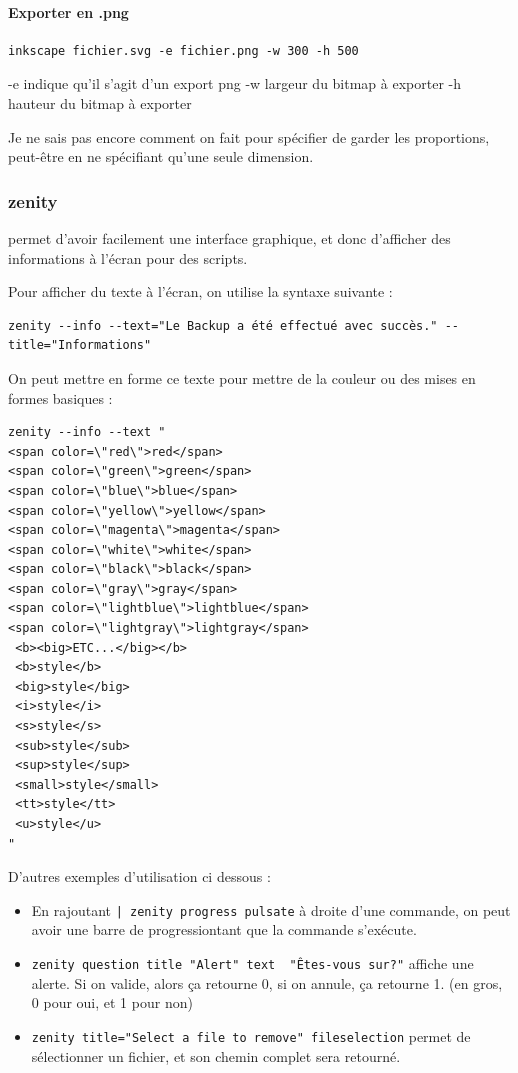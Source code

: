 \documentclass[a4paper,twoside]{article}
\begin{document}
\paragraph{Exporter en .png}
\begin{verbatim}
inkscape fichier.svg -e fichier.png -w 300 -h 500
\end{verbatim}

-e indique qu'il s'agit d'un export png
-w largeur du bitmap à exporter
-h hauteur du bitmap à exporter

\begin{remarque}
Je ne sais pas encore comment on fait pour spécifier de garder les proportions, peut-être en ne spécifiant qu'une seule dimension.
\end{remarque}

\subsubsection{zenity}\label{sec:zenity}
 permet d'avoir facilement une interface graphique, et donc d'afficher des informations à l'écran pour des scripts.

Pour afficher du texte à l'écran, on utilise la syntaxe suivante :

\begin{verbatim}
zenity --info --text="Le Backup a été effectué avec succès." --title="Informations"
\end{verbatim}

On peut mettre en forme ce texte pour mettre de la couleur ou des mises en formes basiques :
\begin{verbatim}
zenity --info --text "
<span color=\"red\">red</span>
<span color=\"green\">green</span>
<span color=\"blue\">blue</span>
<span color=\"yellow\">yellow</span>
<span color=\"magenta\">magenta</span>
<span color=\"white\">white</span>
<span color=\"black\">black</span>
<span color=\"gray\">gray</span>
<span color=\"lightblue\">lightblue</span>
<span color=\"lightgray\">lightgray</span>
 <b><big>ETC...</big></b>
 <b>style</b>
 <big>style</big>
 <i>style</i>
 <s>style</s>
 <sub>style</sub>
 <sup>style</sup>
 <small>style</small>
 <tt>style</tt>
 <u>style</u>
"
\end{verbatim}

D'autres exemples d'utilisation ci dessous :
\begin{itemize}
\item En rajoutant \verb#| zenity progress pulsate# à droite d'une commande, on peut avoir une barre de \og progression\fg tant que la commande s'exécute.
\item \verb|zenity question title "Alert" text  "Êtes-vous sur?"| affiche une alerte. Si on valide, alors ça retourne 0, si on annule, ça retourne 1. (en gros, 0 pour oui, et 1 pour non)
\item \verb|zenity title="Select a file to remove" fileselection| permet de sélectionner un fichier, et son chemin complet sera retourné.
\end{itemize}
\end{document}
